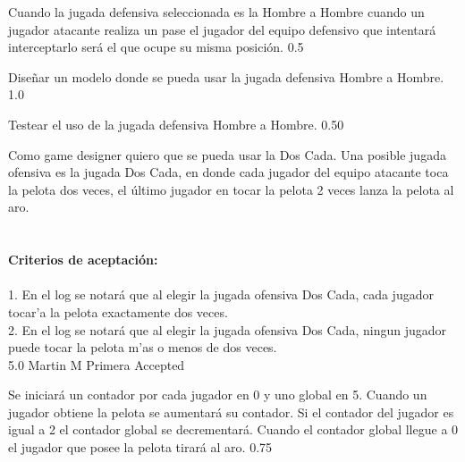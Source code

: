 		{Cuando la jugada defensiva seleccionada es la Hombre a Hombre cuando un jugador atacante realiza un pase el jugador del equipo defensivo que intentará interceptarlo será el que ocupe su misma posición.
} %
		{} %
		{0.5} %
		{} %
		{} %
		{} %

		{Diseñar un modelo donde se pueda usar la jugada defensiva Hombre a Hombre.} %
		{} %
		{1.0} %
		{} %
		{} %
		{} %


		{Testear el uso de la jugada defensiva Hombre a Hombre.} %
		{} %
		{0.50} %
		{} %
		{} %
		{} %

\vspace{20pt}



	{Como game designer quiero que se pueda usar la Dos Cada.} %
	{Una posible jugada ofensiva es la jugada Dos Cada, en donde cada jugador del equipo atacante toca la pelota dos veces, el último jugador en tocar la pelota 2 veces lanza la pelota al aro. \\
  \\
  \\
\textbf{Criterios de aceptación:}\\
  \\
1. En el log se notará que al elegir la jugada ofensiva Dos Cada, cada jugador tocar'a la pelota exactamente dos veces. \\
2. En el log se notará que al elegir la jugada ofensiva Dos Cada, ningun jugador puede tocar la pelota m'as o menos de dos veces. \\
} %
	{} %
	{5.0} %
	{Martin M} %
	{Primera} %
	{Accepted} %

		{Se iniciará un contador por cada jugador en 0 y uno global en 5. Cuando un jugador obtiene la pelota se aumentará su contador. Si el contador del jugador es igual a 2 el contador global se decrementará. Cuando el contador global llegue a 0 el jugador que posee la pelota tirará al aro.} %
		{} %
		{0.75} %
		{} %
		{} %
		{} %

